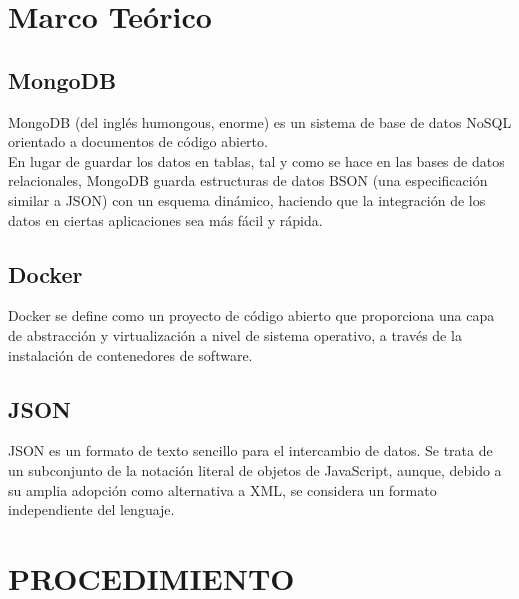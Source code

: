 \documentclass[preprint,12pt]{elsarticle}
\begin{document}



\section{Marco Teórico}




\subsection {\textbf{MongoDB}}
MongoDB (del inglés humongous, enorme) es un sistema de base de datos NoSQL orientado a documentos de código abierto.\\
En lugar de guardar los datos en tablas, tal y como se hace en las bases de datos relacionales, MongoDB guarda estructuras de datos BSON (una especificación similar a JSON) con un esquema dinámico, haciendo que la integración de los datos en ciertas aplicaciones sea más fácil y rápida.

\subsection {\textbf{Docker}}
Docker se define como un proyecto de código abierto que proporciona una capa de abstracción y virtualización a nivel de sistema operativo, a través de la instalación de contenedores de software.

\subsection {\textbf{JSON}}
JSON es un formato de texto sencillo para el intercambio de datos. Se trata de un subconjunto de la notación literal de objetos de JavaScript, aunque, debido a su amplia adopción como alternativa a XML, se considera un formato independiente del lenguaje.

\section{PROCEDIMIENTO}
\end{document}
